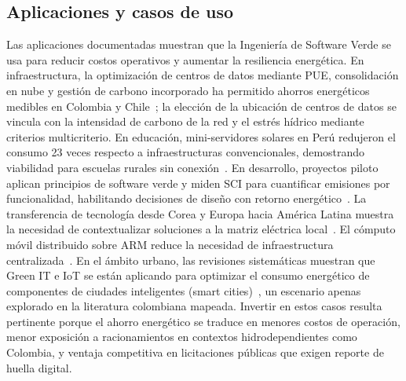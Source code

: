 \documentclass[conference]{IEEEtran}
\begin{document}
\subsection{Aplicaciones y casos de uso}\label{sec:aplicaciones}
Las aplicaciones documentadas muestran que la Ingenier\'ia de Software Verde se usa para reducir costos operativos y aumentar la resiliencia energ\'etica. En infraestructura, la optimizaci\'on de centros de datos mediante PUE, consolidaci\'on en nube y gesti\'on de carbono incorporado ha permitido ahorros energ\'eticos medibles en Colombia y Chile~\cite{garcia2022,torres2026,diaz2017}; la elecci\'on de la ubicaci\'on de centros de datos se vincula con la intensidad de carbono de la red y el estr\'es h\'idrico mediante criterios multicriterio. En educaci\'on, mini-servidores solares en Per\'u redujeron el consumo 23 veces respecto a infraestructuras convencionales, demostrando viabilidad para escuelas rurales sin conexi\'on~\cite{palomino2019}. En desarrollo, proyectos piloto aplican principios de software verde y miden SCI para cuantificar emisiones por funcionalidad, habilitando decisiones de diseño con retorno energ\'etico~\cite{miranda2025,jin2025}. La transferencia de tecnolog\'ia desde Corea y Europa hacia Am\'erica Latina muestra la necesidad de contextualizar soluciones a la matriz el\'ectrica local~\cite{piaggesi2019,cordero2022}. El c\'omputo m\'ovil distribuido sobre ARM reduce la necesidad de infraestructura centralizada~\cite{petrocelli2021}. En el \'ambito urbano, las revisiones sistem\'aticas muestran que Green IT e IoT se est\'an aplicando para optimizar el consumo energ\'etico de componentes de ciudades inteligentes (smart cities)~\cite{he2022greensmartcities}, un escenario apenas explorado en la literatura colombiana mapeada. Invertir en estos casos resulta pertinente porque el ahorro energ\'etico se traduce en menores costos de operaci\'on, menor exposici\'on a racionamientos en contextos hidrodependientes como Colombia, y ventaja competitiva en licitaciones p\'ublicas que exigen reporte de huella digital.
\end{document}

